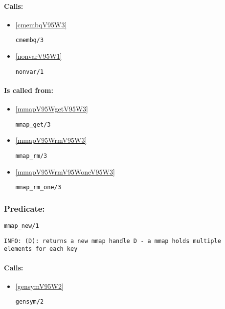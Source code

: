 \paragraph{Calls:} 
\begin{itemize}
\item \ref{cmembqV95W3} 
\begin{verbatim}
cmembq/3
\end{verbatim}

\item \ref{nonvarV95W1} 
\begin{verbatim}
nonvar/1
\end{verbatim}

\end{itemize}
\paragraph{Is called from:} 
\begin{itemize}
\item \ref{mmapV95WgetV95W3} 
\begin{verbatim}
mmap_get/3
\end{verbatim}

\item \ref{mmapV95WrmV95W3} 
\begin{verbatim}
mmap_rm/3
\end{verbatim}

\item \ref{mmapV95WrmV95WoneV95W3} 
\begin{verbatim}
mmap_rm_one/3
\end{verbatim}

\end{itemize}

\subsubsection{Predicate:} \label{mmapV95WnewV95W1}

\begin{verbatim}
mmap_new/1
\end{verbatim}

{\small \begin{verbatim}
INFO: (D): returns a new mmap handle D - a mmap holds multiple elements for each key

\end{verbatim}}
\paragraph{Calls:} 
\begin{itemize}
\item \ref{gensymV95W2} 
\begin{verbatim}
gensym/2
\end{verbatim}

\end{itemize}


